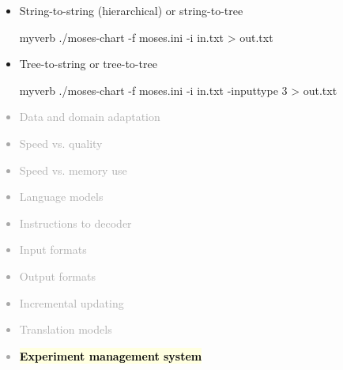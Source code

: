 \documentclass[landscape]{uedslides2C}
\newcommand{\currenttopic}[1]{\colorbox{lightyellow}{\textcolor{black}{\bf #1}}}
\begin{document}



\vspace{15mm}
\begin{itemize}
\item String-to-string (hierarchical) or string-to-tree \\
\begin{center}
\begin{SaveVerbatim}{myverb}
./moses-chart -f moses.ini -i in.txt > out.txt
\end{SaveVerbatim}
\colorbox{gray}{}
\end{center}

\item Tree-to-string or tree-to-tree  \\
\begin{center}
\begin{SaveVerbatim}{myverb}
./moses-chart -f moses.ini -i in.txt -inputtype 3 > out.txt
\end{SaveVerbatim}
\colorbox{gray}{}
\end{center}
\end{itemize}
	 

\vspace{-5mm}
\textcolor{darkgrey}{
\begin{itemize} \itemsep -1mm
\item Data and domain adaptation
\item Speed vs. quality
\item Speed vs. memory use
\item Language models
\item Instructions to decoder
\item Input formats
\item Output formats
\item Incremental updating
\item Translation models
\item \currenttopic{Experiment management system}
\end{itemize}
}
\end{document}
